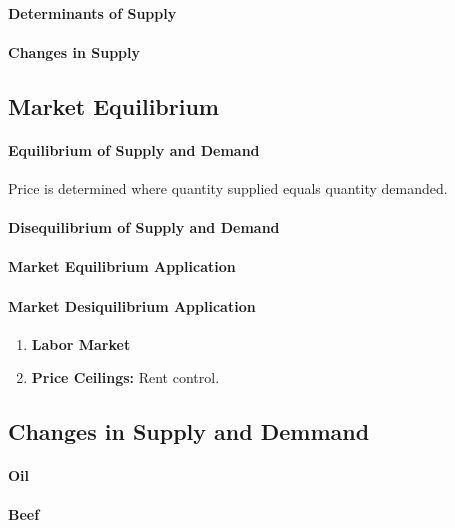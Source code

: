 \paragraph{Determinants of Supply}
\paragraph{Changes in Supply} %

\subsection{Market Equilibrium}
\paragraph{Equilibrium of Supply and Demand} Price is determined where quantity supplied equals quantity demanded.
\paragraph{Disequilibrium of Supply and Demand}

\paragraph{Market Equilibrium Application} %

\paragraph{Market Desiquilibrium Application}

\begin{enumerate}[label = \textbf{(\Roman*)}]
	\item \textbf{Labor Market}
	\item \textbf{Price Ceilings:} Rent control.	
\end{enumerate}

\subsection{Changes in Supply and Demmand}
\paragraph{Oil}
\paragraph{Beef}
